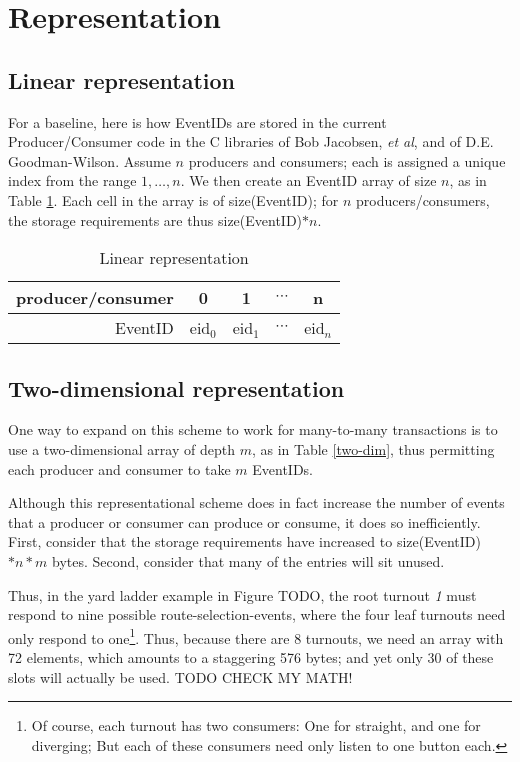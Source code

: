 \documentclass[11pt]{article}
\begin{document}
\section{Representation}

\subsection{Linear representation}

For a baseline, here is how EventIDs are stored in the current Producer/Consumer code in the C libraries of Bob Jacobsen, \textit{et al}, and of D.E. Goodman-Wilson. Assume $n$ producers and consumers; each is assigned a unique index from the range ${1,\ldots,n}$. We then create an EventID array of size $n$, as in Table \ref{linear}. Each cell in the array is of size(EventID); for $n$ producers/consumers, the storage requirements are thus size(EventID)$*n$.
\begin{table}[htdp]
\caption{Linear representation}
\begin{center}
\begin{tabular}{r|c|c|c|c|}
producer/consumer&0&1&$\cdots$&n \\ \hline
EventID&eid$_0$ & eid$_1$ & $\cdots$ &eid$_{n}$\\
\end{tabular}
\end{center}
\label{linear}
\end{table}%

\subsection{Two-dimensional representation}

One way to expand on this scheme to work for many-to-many transactions is to use a two-dimensional array of depth $m$, as in Table \ref{two-dim}, thus permitting each producer and consumer to take $m$ EventIDs.

Although this representational scheme does in fact increase the number of events that a producer or consumer can produce or consume, it does so inefficiently. First, consider that the storage requirements have increased to size(EventID)$*n*m$ bytes. Second, consider that many of the entries will sit unused.

Thus, in the yard ladder example in Figure TODO, the root turnout \textit{1} must respond to nine possible route-selection-events, where the four leaf turnouts need only respond to one\footnote{Of course, each turnout has two consumers: One for straight, and one for diverging; But each of these consumers need only listen to one button each.}. Thus, because there are 8 turnouts, we need an array with 72 elements, which amounts to a staggering 576 bytes; and yet only 30 of these slots will actually be used. TODO CHECK MY MATH!
\end{document}
